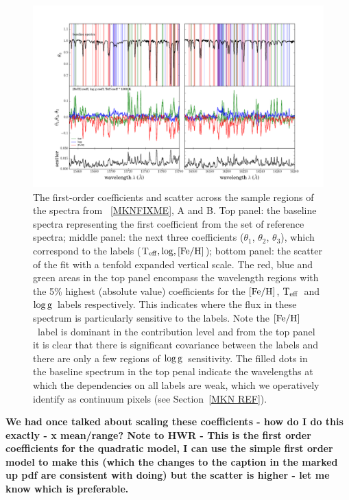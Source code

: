 \documentclass[12pt, preprint]{aastex}
\newcommand{\sectionname}{Section}
\newcommand{\teff}{\mbox{$\rm T_{eff}$}}
\newcommand{\feh}{\mbox{$\rm [Fe/H]$}}
\newcommand{\logg}{\mbox{$\rm \log g$}}
\begin{document}
\begin{figure}[h!]
\centering
    \includegraphics[width=\hsize]{./plots/R1_continuum5.png}
  \caption{The first-order coefficients and scatter across the sample regions of the spectra from \figurename~\ref{MKNFIXME}, A and B. Top panel: the baseline spectra representing the first coefficient from the set of reference spectra; middle panel: the next three coefficients ($\theta_1$, $\theta_2$, $\theta_3$),  which correspond to the labels ($\teff, \log, \feh$); bottom panel: the scatter of the fit with a tenfold expanded vertical scale.  The red, blue and green areas in the top panel encompass the wavelength regions with the 5\% highest (absolute value) coefficients for the \feh, \teff\ and \logg\ labels respectively. This indicates where the flux in these spectrum is particularly sensitive to the labels.  Note the \feh\ label is dominant in the contribution level and from the top panel it is clear that there is significant covariance between the labels and there are only a few regions of \logg\ sensitivity. The filled dots in the baseline spectrum in the top penal indicate the wavelengths at which the dependencies on all labels are weak, which we operatively identify as continuum pixels (see \sectionname~\ref{MKN REF}).}
\label{fig:coeffs}
\end{figure}
\textbf{We had once talked about scaling these coefficients - how do I do this exactly - x mean/range? Note to HWR - This is the first order coefficients for the quadratic model, I can use the simple first order model to make this (which the changes to the caption in the marked up pdf are consistent with doing) but the scatter is higher - let me know which is preferable.}
\end{document}
